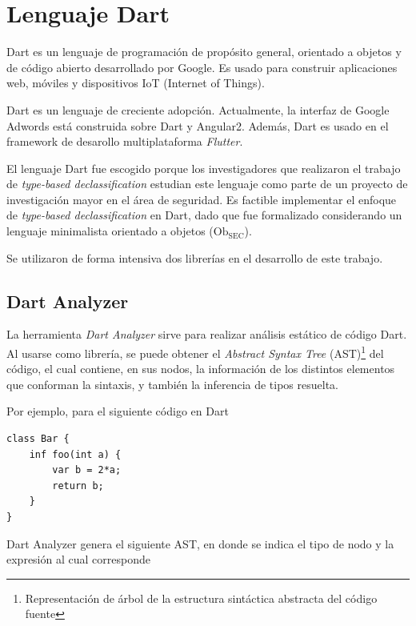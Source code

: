 	\section{Lenguaje Dart}

	Dart es un lenguaje de programación de propósito general, orientado a objetos y de código abierto desarrollado por Google. Es usado para construir aplicaciones web, móviles y dispositivos IoT (Internet of Things). %

	Dart es un lenguaje de creciente adopción. Actualmente, la interfaz de Google Adwords está construida sobre Dart y Angular2. Además, Dart es usado en el framework de desarollo multiplataforma \textit{Flutter}.

	El lenguaje Dart fue escogido porque los investigadores que realizaron el trabajo de \textit{type-based declassification} estudian este lenguaje como parte de un proyecto de investigación mayor en el área de seguridad. Es factible implementar el enfoque de \textit{type-based declassification} en Dart, dado que fue formalizado considerando un lenguaje minimalista orientado a objetos ($\text{Ob}_{\text{SEC}}$).

	Se utilizaron de forma intensiva dos librerías en el desarrollo de este trabajo.

	\subsection{Dart Analyzer}

	La herramienta \textit{Dart Analyzer} sirve para realizar análisis estático de código Dart. Al usarse como librería, se puede obtener el \textit{Abstract Syntax Tree} (AST)\footnote{Representación de árbol de la estructura sintáctica abstracta del código fuente} del código, el cual contiene, en sus nodos, la información de los distintos elementos que conforman la sintaxis, y también la inferencia de tipos resuelta. %

	Por ejemplo, para el siguiente código en Dart

	\begin{lstlisting}
class Bar {
	inf foo(int a) {
		var b = 2*a;
		return b;
	}
}
	\end{lstlisting}

	Dart Analyzer genera el siguiente AST, en donde se indica el tipo de nodo y la expresión al cual corresponde

	\clearpage

